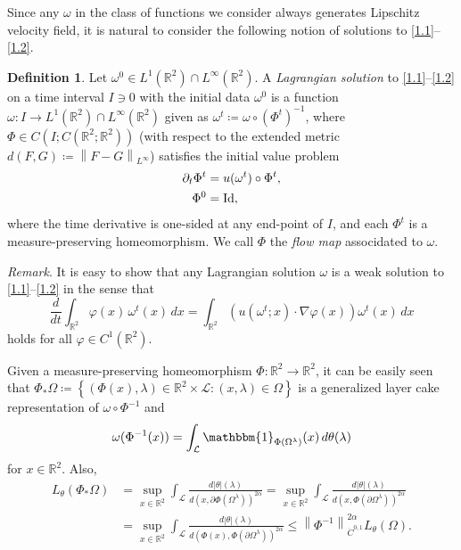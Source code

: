 \documentclass[reqno,centertags,12pt]{amsart}
\theoremstyle{definition}
\newtheorem{definition}[theorem]{Definition}
\numberwithin{equation}{section}
\newcommand{\norm}[1]{\left\|#1\right\|}
\newcommand{\bbR}{{\mathbb{R}}}
\newcommand{\tht}{\theta}
\begin{document}
Since any $\omega$ in the class of functions we consider always generates
Lipschitz velocity field, it is natural to consider
the following notion of solutions to \eqref{1.1}--\eqref{1.2}.

\begin{definition}
    Let $\omega^{0}\in L^{1}(\bbR^{2})\cap L^{\infty}(\bbR^{2})$.
    A \emph{Lagrangian solution}
    to \eqref{1.1}--\eqref{1.2} on a time interval $I\owns 0$ with
    the initial data $\omega^{0}$ is a function
    $\omega\colon I\to L^{1}(\bbR^{2})\cap L^{\infty}(\bbR^{2})$ given as
    $\omega^{t}\coloneqq \omega\circ(\Phi^{t})^{-1}$, where
    $\Phi\in C\left(I;C(\bbR^{2};\bbR^{2})\right)$
    (with respect to the extended metric $d(F,G) \coloneqq \norm{F - G}_{L^{\infty}}$)
    satisfies the initial value problem
    \begin{equation}\label{1.6}
        \begin{aligned}
           \partial_{t}\Phi^{t} &= u(\omega^{t}) \circ \Phi^{t}, \\
            \Phi^{0} &= {\rm Id},
        \end{aligned}
    \end{equation}
    where the time derivative is one-sided at any end-point of $I$,
    and each $\Phi^{t}$ is a measure-preserving homeomorphism.
    We call $\Phi$ the \emph{flow map} associdated to $\omega$.
\end{definition}

\textit{Remark}. It is easy to show that any Lagrangian solution $\omega$ is
a weak solution to \eqref{1.1}--\eqref{1.2} in the sense that
\[
    \frac{d}{dt}\int_{\bbR^{2}}\varphi(x)\,\omega^{t}(x)\,dx
    = \int_{\bbR^{2}}\left(u(\omega^{t};x)\cdot\nabla\varphi(x)\right)
    \omega^{t}(x)\,dx
\]
holds for all $\varphi\in C^{1}(\bbR^{2})$.\bigskip

Given a measure-preserving homeomorphism
$\Phi\colon\bbR^{2}\to\bbR^{2}$, it can be easily seen that
$\Phi_{*}\Omega\coloneqq\left\{(\Phi(x),\lambda)\in\bbR^{2}\times\mathcal{L}\colon
(x,\lambda)\in\Omega\right\}$ is a generalized layer cake representation of
$\omega\circ\Phi^{-1}$ and
\[
    \omega(\Phi^{-1}(x)) = \int_{\mathcal{L}}
    \mathbbm{1}_{\Phi(\Omega^{\lambda})}(x)\,d\theta(\lambda)
\]
for $x\in\bbR^{2}$. Also,
\begin{equation}\label{1.7}
    \begin{aligned}
        L_{\tht}(\Phi_{*}\Omega)
        &= \sup_{x\in\bbR^{2}}\int_{\mathcal{L}}\frac{d|\theta|(\lambda)}
        {d(x,\partial\Phi(\Omega^{\lambda}))^{2\alpha}}
        = \sup_{x\in\bbR^{2}}\int_{\mathcal{L}}\frac{d|\theta|(\lambda)}
        {d(x,\Phi(\partial\Omega^{\lambda}))^{2\alpha}} \\
        &= \sup_{x\in\bbR^{2}}\int_{\mathcal{L}}\frac{d|\theta|(\lambda)}
        {d(\Phi(x),\Phi(\partial\Omega^{\lambda}))^{2\alpha}}
        \leq \norm{\Phi^{-1}}_{\dot{C}^{0,1}}^{2\alpha} L_{\tht}(\Omega).
    \end{aligned}
\end{equation}
\end{document}
